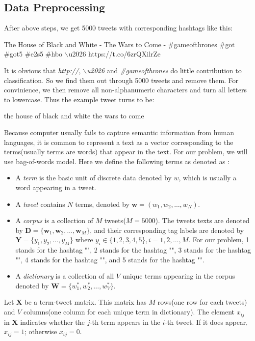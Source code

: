 \documentclass[letterpaper,11pt,twocolumn]{article}
\def\bfw{\mathbf w}
\def\bfW{\mathbf W}
\def\bfD{\mathbf D}
\def\bfY{\mathbf Y}
\def\bfX{\mathbf X}
\begin{document}
\subsection{Data Preprocessing}
After above steps, we get 5000 tweets with corresponding hashtags like this:
\begin{framed}
The House of Black and White - The Wars to Come - \#gameofthrones \#got \#got5 \#e2s5  \#hbo $\backslash$u2026 https://t.co/6zrQXilrZe
\end{framed}
It is obvious that \emph{http://}, \emph{$\backslash$u2026} and \emph{\#gameofthrones} do little contribution to classification. So we find them out through 5000 tweets and remove them. For convinience, we then remove all non-alphanumeric characters and turn all letters to lowercase. Thus the example tweet turns to be:
\begin{framed}
the house of black and white the wars to come
\end{framed}
Because computer usually fails to capture semantic information from human languages, it is common to represent a text as a vector corresponding to the terms(usually terms are words) that appear in the text. For our problem, we will use bag-of-words model. Here we define the following terms as denoted as \cite{blei2003latent}:
\begin{itemize}
\item A \emph{term} is the basic unit of discrete data denoted by $w$, which is usually a word appearing in a tweet.
\item A \emph{tweet} contains $N$ terms, denoted by $\bfw = (w_1, w_2, \dots, w_N)$.
\item A \emph{corpus} is a collection of $M$ tweets($M=5000$). The tweets texts are denoted by $\bfD = \{\bfw_1, \bfw_2, \dots, \bfw_M\}$, and their corresponding tag labels are denoted by $\bfY = \{y_1, y_2, \dots, y_M\}$ where $y_i \in \{1, 2, 3, 4, 5\}, i = 1, 2, \dots, M$. For our problem, 1 stands for the hashtag "", 2 stands for the hashtag "", 3 stands for the hashtag "", 4 stands for the hashtag "", and 5 stands for the hashtag "".
\item A \emph{dictionary} is a collection of all $V$ unique terms appearing in the corpus denoted by $\bfW = \{w_1^*, w_2^*, \dots, w_V^*\}$.
\end{itemize}
Let $\bfX$ be a term-tweet matrix. This matrix has $M$ rows(one row for each tweets) and $V$ columns(one column for each unique term in dictionary). The element $x_{ij}$ in $\bfX$ indicates whether the $j$-th term appears in the $i$-th tweet. If it does appear, $x_{ij} = 1$; otherwise $x_{ij} = 0$.\\
\end{document}
